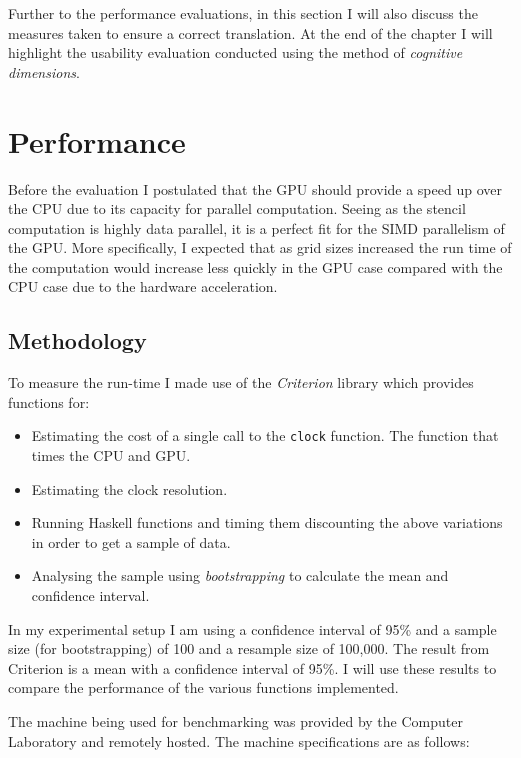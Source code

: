 \documentclass[12pt,a4paper,twoside]{scrbook}
\begin{document}
Further to the performance evaluations, in this section I will also discuss the
measures taken to ensure a correct translation. At the end of the chapter I will
highlight the usability evaluation conducted using the method of \emph{cognitive
  dimensions}.

\section{Performance}

Before the evaluation I postulated that the GPU should provide a speed up over
the CPU due to its capacity for parallel computation. Seeing as the stencil
computation is highly data parallel, it is a perfect fit for the SIMD
parallelism of the GPU. More specifically, I expected that as grid sizes
increased the run time of the computation would increase less quickly in the GPU
case compared with the CPU case due to the hardware acceleration.

\subsection{Methodology}

To measure the run-time I made use of the \emph{Criterion}
library\cite{criterion} which provides functions for:

\begin{itemize}
\itemsep1pt\parskip0pt
\item Estimating the cost of a single call to the \texttt{clock} function.  The
  function that times the CPU and GPU.
\item Estimating the clock resolution.
\item Running Haskell functions and timing them discounting the above variations
  in order to get a sample of data.
\item Analysing the sample using \emph{bootstrapping}\cite{efron1981} to
  calculate the mean and confidence interval.
\end{itemize}

In my experimental setup I am using a confidence interval of 95\% and a sample
size (for bootstrapping) of 100 and a resample size of 100,000. The result from
Criterion is a mean with a confidence interval of 95\%. I will use these results
to compare the performance of the various functions implemented.

The machine being used for benchmarking was provided by the Computer Laboratory
and remotely hosted. The machine specifications are as follows:
\end{document}
